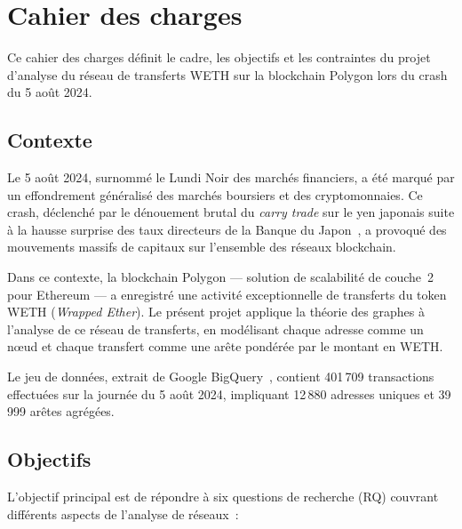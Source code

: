 
\section{Cahier des charges}
\label{ann:cahier}

Ce cahier des charges d\'efinit le cadre, les objectifs et les contraintes du projet d'analyse du r\'eseau de transferts WETH sur la blockchain Polygon lors du crash du 5 ao\^ut 2024.


\subsection{Contexte}

Le 5 ao\^ut 2024, surnomm\'e le \og Lundi Noir \fg{} des march\'es financiers, a \'et\'e marqu\'e par un effondrement g\'en\'eralis\'e des march\'es boursiers et des cryptomonnaies. Ce crash, d\'eclench\'e par le d\'enouement brutal du \textit{carry trade} sur le yen japonais suite \`a la hausse surprise des taux directeurs de la Banque du Japon~\cite{boj2024rate, reuters2024carrytrade}, a provoqu\'e des mouvements massifs de capitaux sur l'ensemble des r\'eseaux blockchain.

Dans ce contexte, la blockchain Polygon --- solution de scalabilit\'e de couche~2 pour Ethereum --- a enregistr\'e une activit\'e exceptionnelle de transferts du token WETH (\textit{Wrapped Ether}). Le pr\'esent projet applique la th\'eorie des graphes \`a l'analyse de ce r\'eseau de transferts, en mod\'elisant chaque adresse comme un n\oe ud et chaque transfert comme une ar\^ete pond\'er\'ee par le montant en WETH.

Le jeu de donn\'ees, extrait de Google BigQuery~\cite{bigquery_public}, contient 401\,709 transactions effectu\'ees sur la journ\'ee du 5 ao\^ut 2024, impliquant 12\,880 adresses uniques et 39\,999 ar\^etes agr\'eg\'ees.


\subsection{Objectifs}

L'objectif principal est de r\'epondre \`a six questions de recherche (RQ) couvrant diff\'erents aspects de l'analyse de r\'eseaux~:

